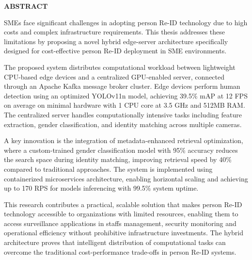 \documentclass[../main.tex]{subfiles}
\begin{document}
\begin{center}
    \Large{\textbf{ABSTRACT}}\\
\end{center}
\vspace{1cm}

SMEs face significant challenges in adopting person Re-ID technology due to high costs and complex infrastructure requirements. This thesis addresses these limitations by proposing a novel hybrid edge-server architecture specifically designed for cost-effective person Re-ID deployment in SME environments.

The proposed system distributes computational workload between lightweight CPU-based edge devices and a centralized GPU-enabled server, connected through an Apache Kafka message broker cluster. Edge devices perform human detection using an optimized YOLOv11n model, achieving 39.5\% mAP at 12 FPS on average on minimal hardware with 1 CPU core at 3.5 GHz and 512MB RAM. The centralized server handles computationally intensive tasks including feature extraction, gender classification, and identity matching across multiple cameras.

A key innovation is the integration of metadata-enhanced retrieval optimization, where a custom-trained gender classification model with 95\% accuracy reduces the search space during identity matching, improving retrieval speed by 40\% compared to traditional approaches. The system is implemented using containerized microservices architecture, enabling horizontal scaling and achieving up to 170 RPS for models inferencing with 99.5\% system uptime.

This research contributes a practical, scalable solution that makes person Re-ID technology accessible to organizations with limited resources, enabling them to access surveillance applications in staffs management, security monitoring and operational efficiency without prohibitive infrastructure investments. The hybrid architecture proves that intelligent distribution of computational tasks can overcome the traditional cost-performance trade-offs in person Re-ID systems.
\end{document}
